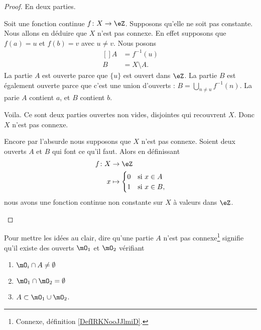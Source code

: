 \begin{proof}
	En deux parties.
	\begin{subproof}
		\spitem[\( \Rightarrow\)]
		Soit une fonction continue \(f \colon X\to \eZ  \). Supposons qu'elle ne soit pas constante. Nous allons en déduire que \( X\) n'est pas connexe. En effet supposons que \( f(a)=u\) et \( f(b)=v\) avec \( u\neq v\). Nous posons
		\begin{equation}
			\begin{aligned}[]
				A & =f^{-1}(u)     \\
				B & =X\setminus A.
			\end{aligned}
		\end{equation}
		La partie \( A\) est ouverte parce que \( \{ u \}\) est ouvert dans \( \eZ\). La partie \( B\) est également ouverte parce que c'est une union d'ouverts :  \( B=\bigcup_{n\neq u}f^{-1}(n)\). La parie \( A\) contient \( a\), et \( B\) contient \( b\).

		Voila. Ce sont deux parties ouvertes non vides, disjointes qui recouvrent \( X\). Donc \( X\) n'est pas connexe.

		\spitem[\( \Leftarrow\)]
		Encore par l'absurde nous supposons que \( X\) n'est pas connexe. Soient deux ouverts \( A\) et \( B\) qui font ce qu'il faut. Alors en définissant
		\begin{equation}
			\begin{aligned}
				f\colon X & \to \eZ                       \\
				x         & \mapsto \begin{cases}
					                    0 & \text{si } x\in A \\
					                    1 & \text{si }x\in B,
				                    \end{cases}
			\end{aligned}
		\end{equation}
		nous avons une fonction continue non constante sur \( X\) à valeurs dans \( \eZ\).
	\end{subproof}
\end{proof}

\begin{normaltext}      \label{NORMooSCAWooPFnrVj}
	Pour mettre les idées au clair, dire qu'une partie \( A\) n'est pas connexe\footnote{Connexe, définition \ref{DefIRKNooJJlmiD}.} signifie qu'il existe des ouverts \( \mO_1\) et \( \mO_2\) vérifiant
	\begin{enumerate}
		\item   \label{ITEMooRACDooKLaVXP}
		      \( \mO_i\cap A\neq\emptyset\)
		\item       \label{ITEMooNCQVooNjAYCT}
		      \( \mO_1\cap\mO_2=\emptyset\)
		\item       \label{ITEMooPIHJooNJYpQo}
		      \( A\subset  \mO_1\cup\mO_2  \).
	\end{enumerate}
\end{normaltext}

